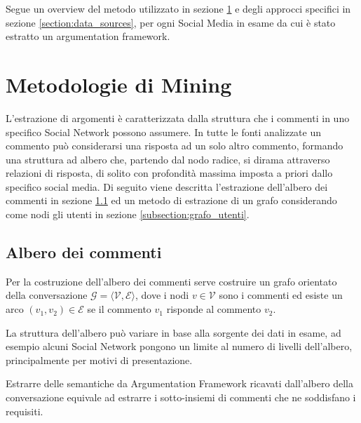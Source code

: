 



Segue un overview del metodo utilizzato in sezione \ref{section:approcci} e degli approcci specifici in sezione \ref{section:data_sources}, per ogni Social Media in esame da cui è stato estratto un argumentation framework.

\section{Metodologie di Mining}
\label{section:approcci}
L'estrazione di argomenti è caratterizzata dalla struttura che i commenti in uno specifico Social Network possono assumere. In tutte le fonti analizzate un commento può considerarsi una risposta ad un solo altro commento, formando una struttura ad albero che, partendo dal nodo radice, si dirama attraverso relazioni di risposta, di solito con profondità massima imposta a priori dallo specifico social media. Di seguito viene descritta l'estrazione dell'albero dei commenti in sezione \ref{subsection:albero_commenti} ed un metodo di estrazione di un grafo considerando come nodi gli utenti in sezione \ref{subsection:grafo_utenti}.

\subsection{Albero dei commenti}
\label{subsection:albero_commenti}
Per la costruzione dell'albero dei commenti serve costruire un grafo orientato della conversazione $\mathcal{G = ⟨V, E⟩}$, dove i nodi $v \in \mathcal{V}$ sono i commenti ed esiste un arco $(v_1,v_2) \in \mathcal{E}$ se il commento $v_1$ risponde al commento $v_2$.

La struttura dell'albero può variare in base alla sorgente dei dati in esame, ad esempio alcuni Social Network pongono un limite al numero di livelli dell'albero, principalmente per motivi di presentazione.

Estrarre delle semantiche da Argumentation Framework ricavati dall'albero della conversazione equivale ad estrarre i sotto-insiemi di commenti che ne soddisfano i requisiti.


